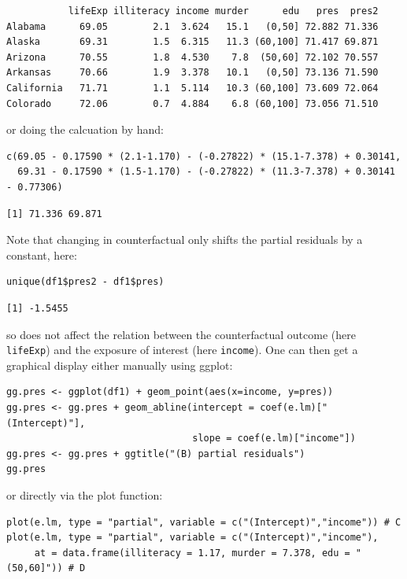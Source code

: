 \documentclass[12pt]{article}
\begin{document}
\begin{verbatim}
           lifeExp illiteracy income murder      edu   pres  pres2
Alabama      69.05        2.1  3.624   15.1   (0,50] 72.882 71.336
Alaska       69.31        1.5  6.315   11.3 (60,100] 71.417 69.871
Arizona      70.55        1.8  4.530    7.8  (50,60] 72.102 70.557
Arkansas     70.66        1.9  3.378   10.1   (0,50] 73.136 71.590
California   71.71        1.1  5.114   10.3 (60,100] 73.609 72.064
Colorado     72.06        0.7  4.884    6.8 (60,100] 73.056 71.510
\end{verbatim}


or doing the calcuation by hand:
\lstset{language=r,label= ,caption= ,captionpos=b,numbers=none}
\begin{lstlisting}
c(69.05 - 0.17590 * (2.1-1.170) - (-0.27822) * (15.1-7.378) + 0.30141,
  69.31 - 0.17590 * (1.5-1.170) - (-0.27822) * (11.3-7.378) + 0.30141 - 0.77306)
\end{lstlisting}

\begin{verbatim}
[1] 71.336 69.871
\end{verbatim}


Note that changing in counterfactual only shifts the partial residuals
by a constant, here:
\lstset{language=r,label= ,caption= ,captionpos=b,numbers=none}
\begin{lstlisting}
unique(df1$pres2 - df1$pres)
\end{lstlisting}

\begin{verbatim}
[1] -1.5455
\end{verbatim}


so does not affect the relation between the counterfactual outcome
(here \texttt{lifeExp}) and the exposure of interest (here \texttt{income}). One can
then get a graphical display either manually using ggplot:
\lstset{language=r,label= ,caption= ,captionpos=b,numbers=none}
\begin{lstlisting}
gg.pres <- ggplot(df1) + geom_point(aes(x=income, y=pres))
gg.pres <- gg.pres + geom_abline(intercept = coef(e.lm)["(Intercept)"],
                                 slope = coef(e.lm)["income"])
gg.pres <- gg.pres + ggtitle("(B) partial residuals")
gg.pres
\end{lstlisting}

or directly via the plot function:
\lstset{language=r,label= ,caption= ,captionpos=b,numbers=none}
\begin{lstlisting}
plot(e.lm, type = "partial", variable = c("(Intercept)","income")) # C
plot(e.lm, type = "partial", variable = c("(Intercept)","income"),
     at = data.frame(illiteracy = 1.17, murder = 7.378, edu = "(50,60]")) # D
\end{lstlisting}
\end{document}
